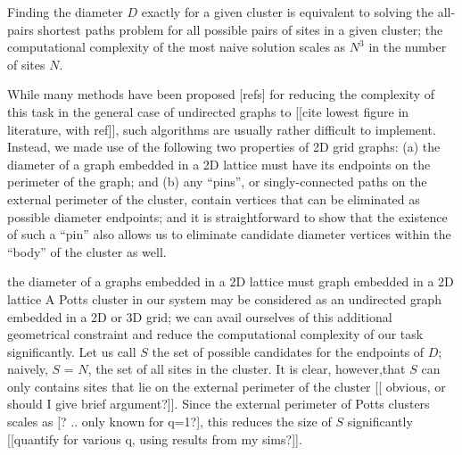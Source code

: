 \documentclass[pre,preprint]{revtex4}
\begin{document}
Finding the diameter $D$ exactly for a given cluster is equivalent to solving the all-pairs shortest paths problem for all possible pairs of sites in a given cluster;  the computational complexity of the most naive solution scales as $N^3$ in the number of sites $N$.  

While many methods have been proposed [refs] for reducing the complexity of this task in the general case of undirected graphs to [[cite lowest figure in literature, with ref]], such algorithms are usually rather difficult to implement.  Instead, we made use of the following two properties of 2D grid graphs:  (a) the diameter of a graph embedded in a 2D lattice must have its endpoints on the perimeter of the graph; and (b) any ``pins'', or singly-connected paths on the external perimeter of the cluster, contain vertices that can be eliminated as possible diameter endpoints; and it is straightforward to show that the existence of such a ``pin'' also allows us to eliminate candidate diameter vertices within the ``body'' of the cluster as well.  

the diameter of a graphs embedded in a 2D lattice must graph embedded in a 2D lattice A Potts cluster in our system may be considered as an undirected graph embedded in a 2D or 3D grid; we can avail ourselves of this additional geometrical constraint and reduce the computational complexity of our task significantly. Let us call $S$ the set of possible candidates for the endpoints of $D$; naively, $S$ = $N$, the set of all sites in the cluster. It is clear, however,that $S$ can only contains sites that lie on the external perimeter of the cluster [[ obvious, or should I give brief argument?]]. Since the external perimeter of Potts clusters scales as [? .. only known for q=1?], this reduces the size of $S$ significantly [[quantify for various q, using results from my sims?]].  
\end{document}
